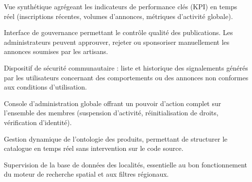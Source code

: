 
Vue synthétique agrégeant les indicateurs de performance clés (KPI) en temps réel (inscriptions récentes, volumes d'annonces, métriques d'activité globale).


Interface de gouvernance permettant le contrôle qualité des publications. Les administrateurs peuvent approuver, rejeter ou sponsoriser manuellement les annonces soumises par les artisans.


Dispositif de sécurité communautaire : liste et historique des signalements générés par les utilisateurs concernant des comportements ou des annonces non conformes aux conditions d'utilisation.


Console d'administration globale offrant un pouvoir d'action complet sur l'ensemble des membres (suspension d'activité, réinitialisation de droits, vérification d'identité).


Gestion dynamique de l'ontologie des produits, permettant de structurer le catalogue en temps réel sans intervention sur le code source.


Supervision de la base de données des localités, essentielle au bon fonctionnement du moteur de recherche spatial et aux filtres régionaux.
